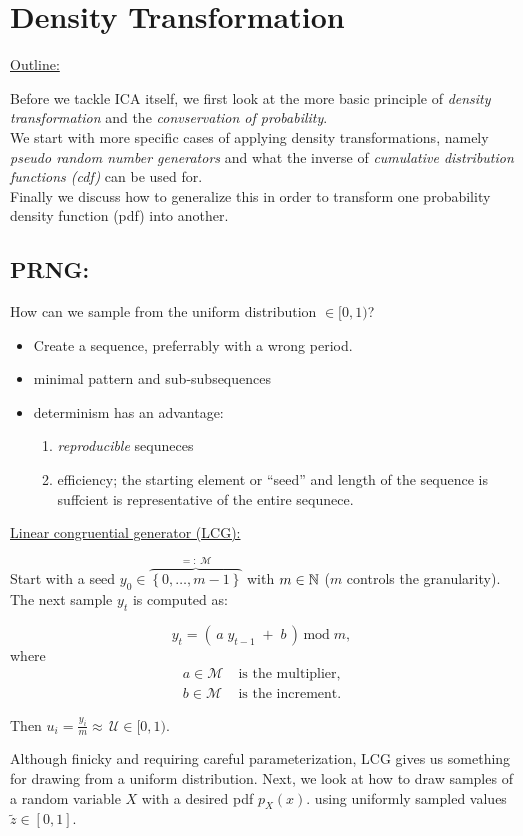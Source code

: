 \section{Density Transformation}

\underline{Outline:}

Before we tackle ICA itself, we first look at the more basic principle of \emph{density transformation} and 
the \emph{convservation of probability}.\\
We start with more specific cases of applying density transformations, 
namely \emph{pseudo random number generators} and what the inverse of \emph{cumulative distribution functions (cdf)} can be used for.\\
Finally we discuss how to generalize this in order to transform one probability density function (pdf) into another.

\subsection{PRNG:}

How can we sample from the uniform distribution $\in \lbrack0, 1)$?

\begin{itemize}
\item Create a sequence, preferrably with a wrong period.
\item minimal pattern and sub-subsequences
\item determinism has an advantage:
\begin{enumerate}
	\item \emph{reproducible} sequneces
	\item efficiency; the starting element or ``seed'' and length of the sequence is suffcient is representative of the entire sequnece.
\end{enumerate}
\end{itemize}

\underline{Linear congruential generator (LCG):}

Start with a seed $y_0 \in \overbrace{\left\{0,\ldots,m-1\right\}}^{=:\;\mathcal{M}}$ with $m \in \mathbb{N}$ ($m$ controls the granularity). 
The next sample $y_t$ is computed as:

\begin{equation}
y_t = \left( \, a \; y_{t-1} \; + \; b \, \right) \, \text{mod} \; m,
\end{equation}
where\\[-0.7cm]
\begin{align*}
a \in \mathcal{M}&\; \text{is the multiplier,} \\
b \in \mathcal{M}&\; \text{is the increment.}
\end{align*}

Then $u_i = \frac{y_i}{m} \approx \,\mathcal{U} \in \lbrack0, 1)$.

Although finicky and requiring careful parameterization, LCG gives us something for drawing from a uniform distribution. 
Next, we look at how to draw samples of a random variable $X$ with a desired pdf $p_X(x)$. 
using uniformly sampled values $\tilde z \in [0,1]$.

